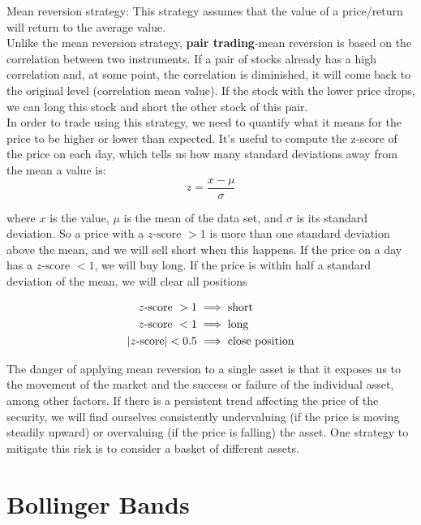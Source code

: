 \documentclass[a4paper,11pt]{article}  %
\begin{document}
Mean reversion strategy: This strategy assumes that the value of a price/return
will return to the average value. \\

Unlike the mean reversion strategy, \textbf{pair trading}-mean reversion is based on the
correlation between two instruments. If a pair of stocks already has a high
correlation and, at some point, the correlation is diminished, it will come back to
the original level (correlation mean value). If the stock with the lower price
drops, we can long this stock and short the other stock of this pair.\\



In order to trade using this strategy, we need to quantify what it means for the price to be higher or lower than expected. It's useful to compute the z-score of the price on each day, which tells us how many standard deviations away from the mean a value is:
$$ z = \frac{x - \mu}{\sigma} $$

where $x$ is the value, $\mu$ is the mean of the data set, and $\sigma$ is its standard deviation. So a price with a $z\text{-score }> 1$ is more than one standard deviation above the mean, and we will sell short when this happens. If the price on a day has a $z\text{-score }< 1$, we will buy long. If the price is within half a standard deviation of the mean, we will clear all positions

\begin{align}
z\text{-score }> 1 & \implies {\rm short} \nonumber\\
z\text{-score }< 1 &\implies {\rm long} \nonumber\\
|z\text{-score}| < 0.5 &\implies \text{close position} \nonumber
\end{align}


The danger of applying mean reversion to a single asset is that it exposes us to the movement of the market and the success or failure of the individual asset, among other factors. If there is a persistent trend affecting the price of the security, we will find ourselves consistently undervaluing (if the price is moving steadily upward) or overvaluing (if the price is falling) the asset. One strategy to mitigate this risk is to consider a basket of different assets.\\


\section{Bollinger Bands}
\end{document}
